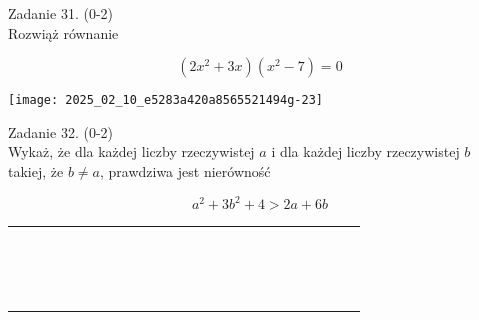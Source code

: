 \documentclass[10pt]{article}
\begin{document}
Zadanie 31. (0-2)\\
Rozwiąż równanie

\[
\left(2 x^{2}+3 x\right)\left(x^{2}-7\right)=0
\]

\begin{center}
\texttt{[image: 2025\_02\_10\_e5283a420a8565521494g-23]}
\end{center}

Zadanie 32. (0-2)\\
Wykaż, że dla każdej liczby rzeczywistej \(a\) i dla każdej liczby rzeczywistej \(b\) takiej, że \(b \neq a\), prawdziwa jest nierówność

\[
a^{2}+3 b^{2}+4>2 a+6 b
\]

\begin{center}
\begin{tabular}{|c|c|c|c|c|c|c|c|c|c|c|c|c|c|c|c|c|c|c|c|c|c|}
\hline
 &  &  &  &  &  &  &  &  &  &  &  &  &  &  &  &  &  &  &  &  &  \\
\hline
 &  &  &  &  &  &  &  &  &  &  &  &  &  &  &  &  &  &  &  &  &  \\
\hline
 &  &  &  &  &  &  &  &  &  &  &  &  &  &  &  &  &  &  &  &  &  \\
\hline
 &  &  &  &  &  &  &  &  &  &  &  &  &  &  &  &  &  &  &  &  &  \\
\hline
 &  &  &  &  &  &  &  &  &  &  &  &  &  &  &  &  &  &  &  &  &  \\
\hline
 &  &  &  &  &  &  &  &  &  &  &  &  &  &  &  &  &  &  &  &  &  \\
\hline
 &  &  &  &  &  &  &  &  &  &  &  &  &  &  &  &  &  &  &  &  &  \\
\hline
 &  &  &  &  &  &  &  &  &  &  &  &  &  &  &  &  &  &  &  &  &  \\
\hline
 &  &  &  &  &  &  &  &  &  &  &  &  &  &  &  &  &  &  &  &  &  \\
\hline
 &  &  &  &  &  &  &  &  &  &  &  &  &  &  &  &  &  &  &  &  &  \\
\hline
 &  &  &  &  &  &  &  &  &  &  &  &  &  &  &  &  &  &  &  &  &  \\
\hline
 &  &  &  &  &  &  &  &  &  &  &  &  &  &  &  &  &  &  &  &  &  \\
\hline
 &  &  &  &  &  &  &  &  &  &  &  &  &  &  &  &  &  &  &  &  &  \\
\hline
 &  &  &  &  &  &  &  &  &  &  &  &  &  &  &  &  &  &  &  &  &  \\
\hline
 &  &  &  &  &  &  &  &  &  &  &  &  &  &  &  &  &  &  &  &  &  \\

\end{tabular}
\end{center}
\end{document}
